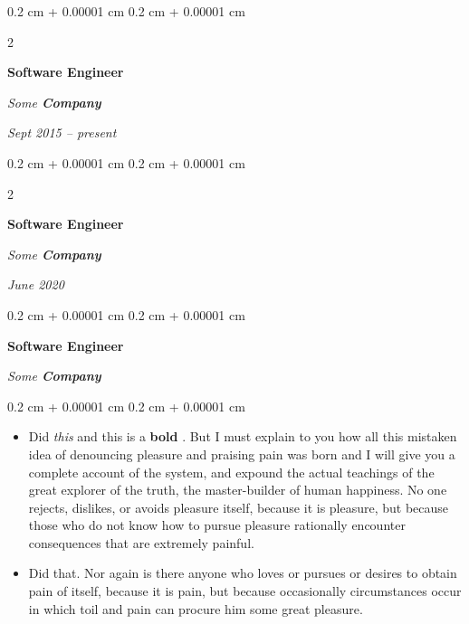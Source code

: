 \documentclass[10pt, letterpaper]{article}
\newenvironment{highlights}{
    \begin{itemize}[
        topsep=0.10 cm,
        parsep=0.10 cm,
        partopsep=0pt,
        itemsep=0pt,
        leftmargin=0.4 cm + 10pt
    ]
}{
    \end{itemize}
} %
\newenvironment{onecolentry}{
    \begin{adjustwidth}{
        0.2 cm + 0.00001 cm
    }{
        0.2 cm + 0.00001 cm
    }
}{
    \end{adjustwidth}
} %
\newenvironment{twocolentry}[2][]{
    \onecolentry
    \def\secondColumn{#2}
    \setcolumnwidth{\fill, 4.5 cm}
    \begin{paracol}{2}
}{
    \switchcolumn \raggedleft \secondColumn
    \end{paracol}
    \endonecolentry
} %
\let\hrefWithoutArrow\href
\renewcommand{\href}[2]{\hrefWithoutArrow{#1}{\ifthenelse{\equal{#2}{}}{ }{#2 }\raisebox{.15ex}{\footnotesize \faExternalLink*}}}
\begin{document}
        \vspace{0.2 cm}

            \begin{twocolentry}{


        \textit{Sept 2015 – present}    }
                \textbf{Software Engineer}

                \textit{Some \textbf{Company}}
            \end{twocolentry}



        \vspace{0.2 cm}

            \begin{twocolentry}{


        \textit{June 2020}    }
                \textbf{Software Engineer}

                \textit{Some \textbf{Company}}
            \end{twocolentry}



        \vspace{0.2 cm}

            \begin{onecolentry}
                \textbf{Software Engineer}

                \textit{Some \textbf{Company}}
            \end{onecolentry}

        \vspace{0.10 cm}
        \begin{onecolentry}
            \begin{highlights}
                \item Did \textit{this} and this is a \textbf{bold} \href{https://example.com}{link}. But I must explain to you how all this mistaken idea of denouncing pleasure and praising pain was born and I will give you a complete account of the system, and expound the actual teachings of the great explorer of the truth, the master-builder of human happiness. No one rejects, dislikes, or avoids pleasure itself, because it is pleasure, but because those who do not know how to pursue pleasure rationally encounter consequences that are extremely painful.
                \item Did that. Nor again is there anyone who loves or pursues or desires to obtain pain of itself, because it is pain, but because occasionally circumstances occur in which toil and pain can procure him some great pleasure.
            \end{highlights}
        \end{onecolentry}
\end{document}
